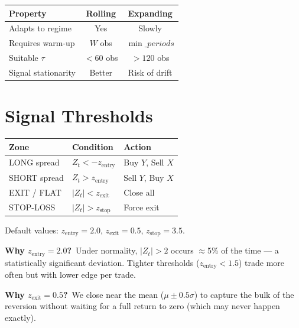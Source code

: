 \documentclass[10pt,a4paper,twocolumn]{article}
\begin{document}
\begin{center}
{\small
\begin{tabular}{@{}lcc@{}}
\toprule
Property & Rolling & Expanding\\
\midrule
Adapts to regime & Yes & Slowly\\
Requires warm-up & $W$ obs & $\min\_periods$\\
Suitable $\tau$ & $<60$ obs & $>120$ obs\\
Signal stationarity & Better & Risk of drift\\
\bottomrule
\end{tabular}
}
\end{center}

\section{Signal Thresholds}

\begin{tcolorbox}[mathbox={Formula 3 --- Threshold Zones}]
\vspace{-4pt}
\begin{center}
{\small
\begin{tabular}{@{}lll@{}}
\toprule
Zone & Condition & Action\\
\midrule
LONG spread & $Z_t < -z_{\text{entry}}$ & Buy $Y$, Sell $X$\\
SHORT spread & $Z_t >  z_{\text{entry}}$ & Sell $Y$, Buy $X$\\
EXIT / FLAT & $|Z_t| < z_{\text{exit}}$ & Close all\\
STOP-LOSS & $|Z_t| > z_{\text{stop}}$ & Force exit\\
\bottomrule
\end{tabular}
}
\end{center}
\vspace{2pt}
Default values: $z_{\text{entry}}=2.0$,\; $z_{\text{exit}}=0.5$,\;
$z_{\text{stop}}=3.5$.
\end{tcolorbox}

\noindent\textbf{Why $z_{\text{entry}}=2.0$?}~Under normality,
$|Z_t|>2$ occurs $\approx$5\% of the time --- a statistically
significant deviation.  Tighter thresholds ($z_{\text{entry}}<1.5$)
trade more often but with lower edge per trade.

\noindent\textbf{Why $z_{\text{exit}}=0.5$?}~We close near the mean
($\mu \pm 0.5\sigma$) to capture the bulk of the reversion without
waiting for a full return to zero (which may never happen exactly).
\end{document}
